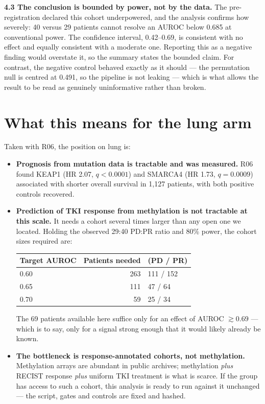 \documentclass[11pt,a4paper]{article}
\begin{document}
\textbf{4.3 The conclusion is bounded by power, not by the data.} The pre-registration
declared this cohort underpowered, and the analysis confirms how severely: 40 versus 29
patients cannot resolve an AUROC below 0.685 at conventional power. The confidence interval,
0.42--0.69, is consistent with no effect and equally consistent with a moderate one. Reporting
this as a negative finding would overstate it, so the summary states the bounded claim. For
contrast, the negative control behaved exactly as it should --- the permutation null is centred
at 0.491, so the pipeline is not leaking --- which is what allows the result to be read as
genuinely uninformative rather than broken.

\section{What this means for the lung arm}

Taken with R06, the position on lung is:

\begin{itemize}[leftmargin=1.2em,itemsep=2pt]
\item \textbf{Prognosis from mutation data is tractable and was measured.} R06 found KEAP1
(HR 2.07, $q<0.0001$) and SMARCA4 (HR 1.73, $q=0.0009$) associated with shorter overall
survival in 1{,}127 patients, with both positive controls recovered.
\item \textbf{Prediction of TKI response from methylation is not tractable at this scale.} It
needs a cohort several times larger than any open one we located. Holding the observed 29:40
PD:PR ratio and 80\% power, the cohort sizes required are:

\begin{center}
\begin{tabular}{@{}lrl@{}}
\toprule
\textbf{Target AUROC} & \textbf{Patients needed} & \textbf{(PD / PR)} \\
\midrule
0.60 & 263 & 111 / 152 \\
0.65 & 111 & \phantom{0}47 / \phantom{0}64 \\
0.70 & \phantom{0}59 & \phantom{0}25 / \phantom{0}34 \\
\bottomrule
\end{tabular}
\end{center}

\noindent The 69 patients available here suffice only for an effect of AUROC $\gtrsim0.69$ ---
which is to say, only for a signal strong enough that it would likely already be known.
\item \textbf{The bottleneck is response-annotated cohorts, not methylation.} Methylation
arrays are abundant in public archives; methylation \emph{plus} RECIST response \emph{plus}
uniform TKI treatment is what is scarce. If the group has access to such a cohort, this
analysis is ready to run against it unchanged --- the script, gates and controls are fixed and
hashed.
\end{itemize}
\end{document}
